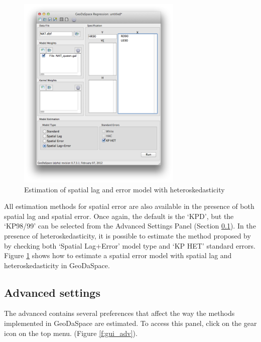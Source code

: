 \documentclass{article}
\begin{document}
\begin{figure}[htb]
\centering
\includegraphics[width=0.7\textwidth]{GS_het_combo.png}
\caption{Estimation of spatial lag and error model with heteroskedasticity}
\label{f:GS_het_combo}
\end{figure}

All estimation methods for spatial error are also available in the presence of both spatial lag and spatial error. Once again, the default is the `KPD', but the `KP98/99' can be selected from the Advanced Settings Panel (Section \ref{s:adv}). In the presence of heteroskedasticity, it is possible to estimate the method proposed by \citet{Arraiz10} by checking both `Spatial Lag+Error' model type and `KP HET' standard errors. Figure \ref{f:GS_het_combo} shows how to estimate a spatial error model with spatial lag and heteroskedasticity in GeoDaSpace.
\FloatBarrier


\subsection{Advanced settings}
\label{s:adv}


The advanced contains several preferences that affect the way the methods implemented in GeoDaSpace are estimated. To access this panel, click on the gear icon on the top menu. (Figure \ref{f:gui_adv}).
 
\end{document}
